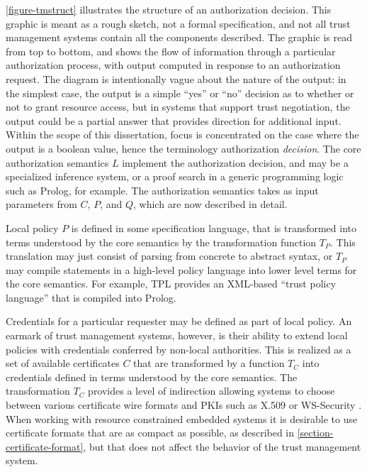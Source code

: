 \autoref{figure-tmstruct} illustrates the structure of an authorization decision. This
graphic is meant as a rough sketch, not a formal specification, and not all trust management
systems contain all the components described. The graphic is read from top to bottom, and shows
the flow of information through a particular authorization process, with output computed in
response to an authorization request. The diagram is intentionally vague about the nature of the
output: in the simplest case, the output is a simple ``yes'' or ``no'' decision as to whether or
not to grant resource access, but in systems that support trust negotiation, the output could be
a partial answer that provides direction for additional input. Within the scope of this
dissertation, focus is concentrated on the case where the output is a boolean value, hence the
terminology authorization \emph{decision}. The core authorization semantics $L$ implement the
authorization decision, and may be a specialized inference system, or a proof search in a
generic programming logic such as Prolog, for example. The authorization semantics takes as
input parameters from $C$, $P$, and $Q$, which are now described in detail.

\tmstructfig

Local policy $P$ is defined in some specification language, that is transformed into terms
understood by the core semantics by the transformation function $T_P$. This translation may just
consist of parsing from concrete to abstract syntax, or $T_P$ may compile statements in a
high-level policy language into lower level terms for the core semantics. For example, TPL
\cite{Herzberg:ACMPKI} provides an XML-based ``trust policy language'' that is compiled into
Prolog.

Credentials for a particular requester may be defined as part of local policy. An earmark of
trust management systems, however, is their ability to extend local policies with credentials
conferred by non-local authorities. This is realized as a set of available certificates $C$ that
are transformed by a function $T_C$ into credentials defined in terms understood by the core
semantics. The transformation $T_C$ provides a level of indirection allowing systems to choose
between various certificate wire formats and PKIs such as X.509 \cite{X509} or WS-Security
\cite{OASIS:WSSTC}. When working with resource constrained embedded systems it is desirable to
use certificate formats that are as compact as possible, as described in
\autoref{section-certificate-format}, but that does not affect the behavior of the trust
management system.

